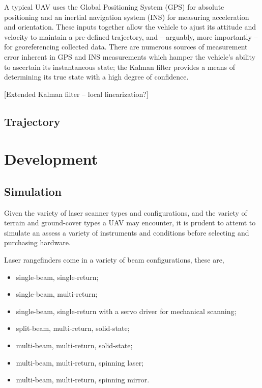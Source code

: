 \documentclass[10pt,a4paper]{report}
\begin{document}
A typical UAV uses the Global Positioning System (GPS) for absolute positioning and an inertial navigation system (INS) for measuring acceleration and orientation. These inputs together allow the vehicle to ajust its attitude and velocity to maintain a pre-defined trajectory, and -- arguably, more importantly -- for georeferencing collected data. There are numerous sources of measurement error inherent in GPS and INS measurements which hamper the vehicle's ability to ascertain its instantaneous state; the Kalman filter provides a means of determining its true state with a high degree of confidence.

[Extended Kalman filter -- local linearization?]

\subsection{Trajectory}



\section{Development}

\subsection{Simulation}

Given the variety of laser scanner types and configurations, and the variety of terrain and ground-cover types a UAV may encounter, it is prudent to attemt to simulate an assess a variety of instruments and conditions before selecting and purchasing hardware. 

Laser rangefinders come in a variety of beam configurations, these are,

\begin{itemize}
\item single-beam, single-return;
\item single-beam, multi-return;
\item single-beam, single-return with a servo driver for mechanical scanning;
\item split-beam, multi-return, solid-state;
\item multi-beam, multi-return, solid-state;
\item multi-beam, multi-return, spinning laser;
\item multi-beam, multi-return, spinning mirror.
\end{itemize}
\end{document}
